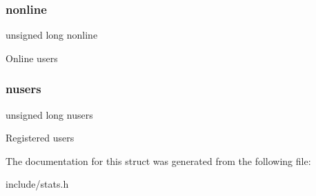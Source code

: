 \subsubsection{\texorpdfstring{nonline}{nonline}}
{\footnotesize\ttfamily unsigned long nonline}

Online users \mbox{\label{structstatistics_adacd907234b18252c5e1ec947deca41f}} 
\subsubsection{\texorpdfstring{nusers}{nusers}}
{\footnotesize\ttfamily unsigned long nusers}

Registered users 

The documentation for this struct was generated from the following file\+:\begin{DoxyCompactItemize}
\item 
include/stats.\+h\end{DoxyCompactItemize}
